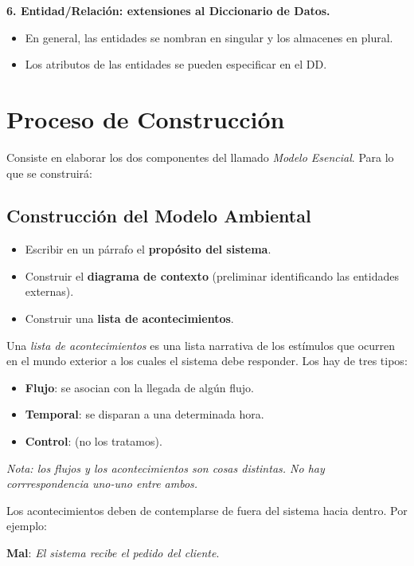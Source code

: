 \textbf{6. Entidad/Relación: extensiones al Diccionario de Datos.}

\begin{itemize}[noitemsep]
\item En general, las entidades se nombran en singular y los almacenes en plural.
\item Los atributos de las entidades se pueden especificar en el DD.
\end{itemize}

\section{Proceso de Construcción}

Consiste en elaborar los dos componentes del llamado \textit{Modelo Esencial}. Para lo que se construirá:

\subsection{Construcción del Modelo Ambiental}

\begin{itemize}[noitemsep]
\item Escribir en un párrafo el \textbf{propósito del sistema}.
\item Construir el \textbf{diagrama de contexto} (preliminar identificando las entidades externas).
\item Construir una \textbf{lista de acontecimientos}.
\end{itemize}

Una \textit{lista de acontecimientos} es una lista narrativa de los estímulos que ocurren en el mundo exterior a los cuales el sistema debe responder. Los hay de tres tipos:

\begin{itemize}[noitemsep]
\item \textbf{Flujo}: se asocian con la llegada de algún flujo.
\item \textbf{Temporal}: se disparan a una determinada hora.
\item \textbf{Control}: (no los tratamos).
\end{itemize}

\textit{Nota: los flujos y los acontecimientos son cosas distintas. No hay corrrespondencia uno-uno entre ambos.}

Los acontecimientos deben de contemplarse de fuera del sistema hacia dentro. Por ejemplo:

\textbf{Mal}: \textit{El sistema recibe el pedido del cliente}.

